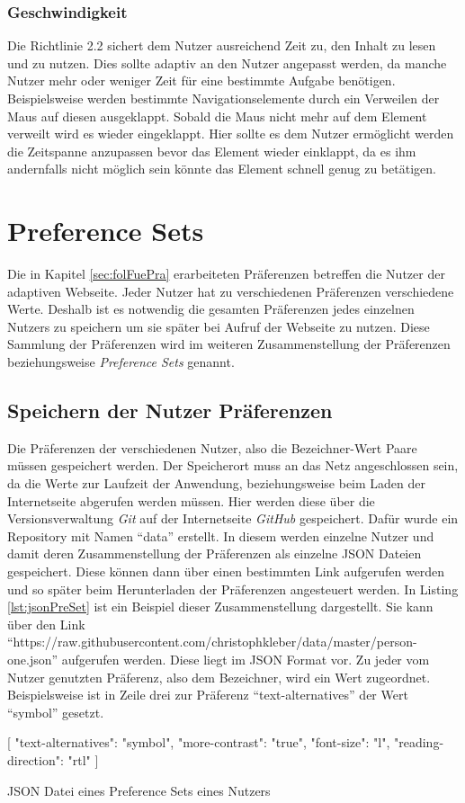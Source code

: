 \documentclass[12pt, paper=a4, bibtotoc, toc=listof, headsepline=true]{scrreprt}
\begin{document}
\subsection{Geschwindigkeit}
Die Richtlinie 2.2 sichert dem Nutzer ausreichend Zeit zu, den Inhalt zu lesen und zu nutzen. Dies sollte adaptiv an den Nutzer angepasst werden, da manche Nutzer mehr oder weniger Zeit für eine bestimmte Aufgabe benötigen. Beispielsweise werden bestimmte Navigationselemente durch ein Verweilen der Maus auf diesen ausgeklappt. Sobald die Maus nicht mehr auf dem Element verweilt wird es wieder eingeklappt. Hier sollte es dem Nutzer ermöglicht werden die Zeitspanne anzupassen bevor das Element wieder einklappt, da es ihm andernfalls nicht möglich sein könnte das Element schnell genug zu betätigen.
\chapter{Preference Sets}
Die in Kapitel \ref{sec:folFuePra} erarbeiteten Präferenzen betreffen die Nutzer der adaptiven Webseite. Jeder Nutzer hat zu verschiedenen Präferenzen verschiedene Werte. Deshalb ist es notwendig die gesamten Präferenzen jedes einzelnen Nutzers zu speichern um sie später bei Aufruf der Webseite zu nutzen. Diese Sammlung der Präferenzen wird im weiteren Zusammenstellung der Präferenzen beziehungsweise \emph{Preference Sets} genannt. 
\section{Speichern der Nutzer Präferenzen}
Die Präferenzen der verschiedenen Nutzer, also die Bezeichner-Wert Paare müssen gespeichert werden. Der Speicherort muss an das Netz angeschlossen sein, da die Werte zur Laufzeit der Anwendung, beziehungsweise beim Laden der Internetseite abgerufen werden müssen. Hier werden diese über die Versionsverwaltung \emph{Git} auf der Internetseite \emph{GitHub} gespeichert. Dafür wurde ein Repository mit Namen \enquote{data} erstellt. In diesem werden einzelne Nutzer und damit deren Zusammenstellung der Präferenzen als einzelne \ac{JSON} Dateien gespeichert. Diese können dann über einen bestimmten Link aufgerufen werden und so später beim Herunterladen der Präferenzen angesteuert werden. In Listing \ref{lst:jsonPreSet} ist ein Beispiel dieser Zusammenstellung dargestellt. Sie kann über den Link \enquote{https://raw.githubusercontent.com/christophkleber/data/master/person-one.json} aufgerufen werden. Diese liegt im \ac{JSON} Format vor. Zu jeder vom Nutzer genutzten Präferenz, also dem Bezeichner, wird ein Wert zugeordnet. Beispielsweise ist in Zeile drei zur Präferenz \enquote{text-alternatives} der Wert \enquote{symbol} gesetzt. 
\begin{listing}
	\begin{JavaScriptcode*}{}
[
   {
      "text-alternatives": "symbol",
      "more-contrast": "true",
      "font-size": "l",
      "reading-direction": "rtl"
   }
]
	\end{JavaScriptcode*}
	\caption[Beispiel eines Preference Sets]{JSON Datei eines Preference Sets eines Nutzers}
	\label{lst:jsonPreSet}
\end{listing}
\end{document}
